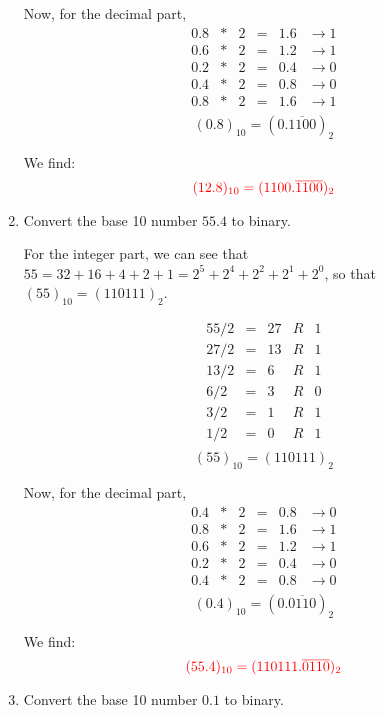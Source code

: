 \documentclass[pdftex,11pt]{article}
\begin{document}
\begin{enumerate}
Now, for the decimal part,
$$
\begin{array}{rcrccc}
0.8& *& 2   & = & 1.6 &    \rightarrow     1  \\
0.6& *& 2   & = & 1.2 &    \rightarrow     1  \\
0.2& *& 2   & = & 0.4 &    \rightarrow     0  \\
0.4& *& 2   & = & 0.8 &    \rightarrow     0  \\
\hline
0.8& *& 2   & = & 1.6 &    \rightarrow     1  \\
\end{array}
$$
$$ (0.8)_{10} = (0.\overline{1100})_2$$

We find:
$$\color{red} (12.8)_{10} = (1100.\overline{1100})_2 $$

\item 
\color{red}Convert the base 10 number $55.4$ to binary.\color{black}


For the integer part, we can see that $55 = 32 + 16 + 4 + 2 + 1 = 2^5 + 2^4 + 2^2 + 2^1 + 2^0 $, so that $(55)_{10}=(110111)_2$.
\begin{minipage}{.4\textwidth}
$$
\begin{array}{rcrcc}
55/2  & = &   27 & R & 1 \\
27/2   & = &  13 & R & 1 \\
13/2  & = &    6 & R & 1 \\
 6/2  & = &    3 & R & 0 \\
 3/2  & = &    1 & R & 1 \\
 1/2  & = &    0 & R & 1 \\
\end{array}
$$
$$ (55)_{10} = (110111)_2$$
\end{minipage}


Now, for the decimal part,
$$
\begin{array}{rcrccc}
0.4& *& 2   & = & 0.8 &    \rightarrow     0  \\
0.8& *& 2   & = & 1.6 &    \rightarrow     1  \\
0.6& *& 2   & = & 1.2 &    \rightarrow     1  \\
0.2& *& 2   & = & 0.4 &    \rightarrow     0  \\
\hline
0.4& *& 2   & = & 0.8 &    \rightarrow     0  \\
\end{array}
$$
$$ (0.4)_{10} = (0.\overline{0110})_2$$

We find:
$$\color{red} (55.4)_{10} = (110111.\overline{0110})_2 $$

\item 
\color{red}Convert the base 10 number $0.1$ to binary.\color{black}



\end{enumerate}
\end{document}
